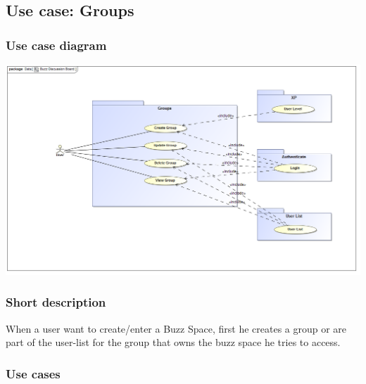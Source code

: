 \subsection{Use case: Groups}
	\subsubsection{Use case diagram}
\includegraphics[width=\textwidth]{groups}
	\subsubsection{Short description}
	\begin{description}
		\item When a user want to create/enter a Buzz Space, first he creates a group or are part of the user-list for the group that owns the buzz space he tries to access. 
	\end{description}
	\subsubsection{Use cases}

